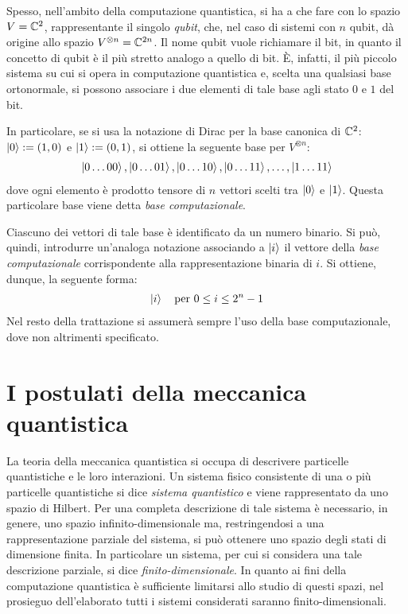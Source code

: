 Spesso, nell'ambito della computazione quantistica, si ha a che fare con lo spazio $V = \mathbb{C}^{2}$, rappresentante il singolo \textit{qubit}, che, nel caso di sistemi con $n$ qubit, dà origine allo spazio $V^{\otimes n} = \mathbb{C}^{2n}$.
Il nome qubit vuole richiamare il bit, in quanto il concetto di qubit è il più stretto analogo a quello di bit.
È, infatti, il più piccolo sistema su cui si opera in computazione quantistica e, scelta una qualsiasi base ortonormale, si possono associare i due elementi di tale base agli stato $0$ e $1$ del bit.

In particolare, se si usa la notazione di Dirac per la base canonica di $\mathbb{C}^{2}$: $\ket{0} := (1,0)$ e $\ket{1} := (0,1)$, si ottiene la seguente base per $V^{\otimes n}$:
\begin{align*}
 \ket{0\dots00}, \ket{0\dots01}, \ket{0\dots10}, \ket{0\dots11},\dots, \ket{1\dots11}
\end{align*}
dove ogni elemento è prodotto tensore di $n$ vettori scelti tra $\ket{0}$ e $\ket{1}$.
Questa particolare base viene detta \textit{base computazionale}. 

Ciascuno dei vettori di tale base è identificato da un numero binario.
Si può, quindi, introdurre un'analoga notazione associando a $\ket{i}$ il vettore della \textit{base computazionale} corrispondente alla rappresentazione binaria di $i$.
Si ottiene, dunque, la seguente forma:
\begin{align*}
 \ket{i} \quad \text{per } 0 \leq i \leq 2^n - 1
\end{align*}
Nel resto della trattazione si assumerà sempre l'uso della base computazionale, dove non altrimenti specificato.

\section{I postulati della meccanica quantistica}\label{sec:postulati_mq}
La teoria della meccanica quantistica si occupa di descrivere particelle quantistiche e le loro interazioni.
Un sistema fisico consistente di una o più particelle quantistiche si dice \textit{sistema quantistico} e viene rappresentato da uno spazio di Hilbert.
Per una completa descrizione di tale sistema è necessario, in genere, uno spazio infinito-dimensionale ma, restringendosi a una rappresentazione parziale del sistema, si può ottenere uno spazio degli stati di dimensione finita. 
In particolare un sistema, per cui si considera una tale descrizione parziale, si dice \textit{finito-dimensionale}.
In quanto ai fini della computazione quantistica è sufficiente limitarsi allo studio di questi spazi, nel prosieguo dell'elaborato tutti i sistemi considerati saranno finito-dimensionali.

